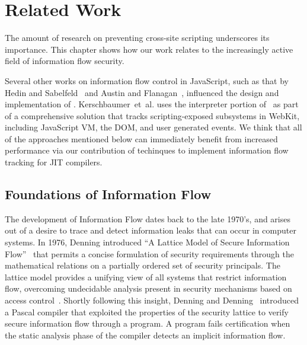 \chapter{Related Work}\label{ch:related-work}

The amount of research on preventing cross-site scripting underscores its importance.
This chapter shows how our work relates to the increasingly active field of information flow security.

Several other works on information flow control in JavaScript, such as that by Hedin and Sabelfeld~\cite{hedin.sabelfeld+12} and Austin and Flanagan~\cite{austin.flanagan+09,austin.flanagan+10,austin.flanagan+12}, influenced the design and implementation of \JitFlow.
Kerschbaumer~et~al.\cite{kerschbaumer.etal+13} uses the interpreter portion of \JitFlow\ as part of a comprehensive solution that tracks scripting-exposed subsystems in WebKit, including JavaScript VM, the DOM, and user generated events.
We think that all of the approaches mentioned below can immediately benefit from increased performance via our contribution of techinques to implement information flow tracking for JIT compilers.


\section{Foundations of Information Flow}


The development of Information Flow dates back to the late 1970's, and arises out of a desire to trace and detect information leaks that can occur in computer systems.
In 1976, Denning introduced ``A Lattice Model of Secure Information Flow''~\cite{denning+76} that permits a concise formulation of security requirements through the mathematical relations on a partially ordered set of security principals.
The lattice model provides a unifying view of all systems that restrict information flow, overcoming undecidable analysis present in security mechanisms based on access control~\cite{lampson+74}.
Shortly following this insight, Denning and Denning~\cite{denning.denning+77} introduced a Pascal compiler that exploited the properties of the security lattice to verify secure information flow through a program.
A program fails certification when the static analysis phase of the compiler detects an implicit information flow.

